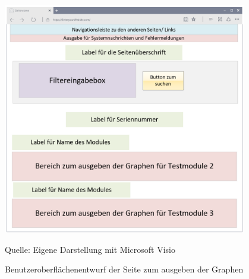 \begin{figure}[H]
    \centering
    \includegraphics[width=0.95\textwidth]{Grafiken/Overlay_Ausgabeseite}
    \caption{Benutzeroberflächenentwurf der Seite zum ausgeben der Graphen}
    \label{fig: Benutzeroberflächenentwurf der Seite zum ausgeben der Graphen}
    {Quelle: Eigene Darstellung mit Microsoft Visio}
\end{figure}